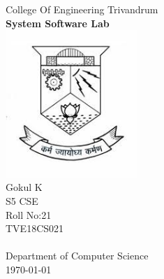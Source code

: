 \documentclass[13pt,oneside]{book}
\begin{document}

\begin{titlepage}
\begin{center}
{\LARGE College Of Engineering Trivandrum}\\[3cm]
\linespread{1.2}\huge {\bfseries System Software Lab}\\[3cm]
\linespread{1}
\includegraphics[width=5cm]{img/emblem.jpeg}\\[3cm]
{\Large Gokul K\\ S5  CSE \\ Roll No:21\\ TVE18CS021 }\\[1cm]


\textit{ }\\[2cm]
Department of Computer Science\\[0.2cm]
\today
\end{center}

\end{titlepage}
\end{document}
